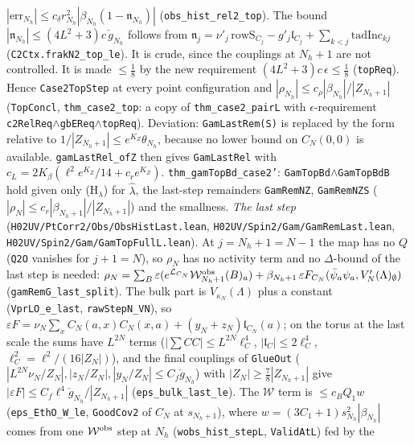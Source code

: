 \documentclass[11pt]{amsart}
\theoremstyle{definition}
\theoremstyle{remark}
\numberwithin{equation}{section}
\begin{document}
$|\mathrm{err}_{N_h}|\le c_\delta r_{N_h}^2|\beta_{N_h}(1-\mathfrak n_{N_h})|$ (\texttt{obs\_hist\_rel2\_top}). The bound
$|\mathfrak n_{N_h}|\le(4L^2+3)c\,\check g_{N_h}$ follows from $\mathfrak n_j=\nu'_j\,\mathrm{rowS}_{C_j}-g'_j\mathfrak l_{C_j}+\sum_{k<j}\mathrm{tadInc}_{kj}$
(\texttt{C2Ctx.frakN2\_top\_le}). It is crude, since the couplings at $N_h+1$ are not controlled. It is made $\le\frac18$ by the new requirement
$(4L^2+3)c\,\epsilon\le\frac18$ (\texttt{topReq}). Hence \texttt{Case2TopStep} at every point configuration and $|\rho_{N_h}|\le c_\rho|\beta_{N_h}|/|Z_{N_h+1}|$
(\texttt{TopConcl}, \texttt{thm\_case2\_top}: a copy of \texttt{thm\_case2\_pairL} with $\epsilon$-requirement
\texttt{c2RelReq}$\wedge$\texttt{gbEReq}$\wedge$\texttt{topReq}).
Deviation: \texttt{GamLastRem(S)} is replaced by the form relative to $1/|Z_{N_h+1}|\le e^{K_Z}\theta_{N_h}$, because no lower bound on $C_N(0,0)$ is available.
\texttt{gamLastRel\_ofZ} then gives \texttt{GamLastRel} with $c_L=2K_\beta(\ell^2e^{K_Z}/14+c_re^{K_Z})$.
\texttt{thm\_gamTopBd\_case2'}: \texttt{GamTopBd}$\wedge$\texttt{GamTopBdB} hold given only (H$_\lambda$) for $\hat\lambda$, the last-step remainders
\texttt{GamRemNZ}, \texttt{GamRemNZS} ($|\rho_N|\le c_r|\beta_{N_h+1}|/|Z_{N_h+1}|$) and the smallness.
\emph{The last step} (\texttt{H02UV/PtCorr2/Obs/ObsHistLast.lean}, \texttt{H02UV/Spin2/Gam/GamRemLast.lean}, \texttt{H02UV/Spin2/Gam/GamTopFullL.lean}). At $j=N_h+1=N-1$ the map has no $Q$ (\texttt{Q2O} vanishes for $j+1=N$), so $\rho_N$ has no activity term and
no $\Delta$-bound of the last step is needed: $\rho_N=\sum_B\varepsilon(e^{\mathcal L_{C_N}}\mathcal W^{\rm obs}_{N_h+1}(B)_a)+\beta_{N_h+1}\,\varepsilon F_{C_N}(\bar\psi_a\psi_a,V'_N(\Lambda)_\emptyset)$
(\texttt{gamRemG\_last\_split}). The bulk part is $V_{\kappa_N}(\Lambda)$ plus a constant (\texttt{VprLO\_e\_last}, \texttt{rawStepN\_VN}), so
$\varepsilon F=\nu_N\sum_xC_N(a,x)C_N(x,a)+(y_N+z_N)\mathfrak l_{C_N}(a)$; on the torus at the last scale the sums have $L^{2N}$ terms
($|\sum CC|\le L^{2N}\ell_C^4$, $|\mathfrak l_C|\le2\ell_C^4$, $\ell_C^2=\ell^2/(16|Z_N|)$), and the final couplings of \texttt{GlueOut}
($|L^{2N}\nu_N/Z_N|,|z_N/Z_N|,|y_N/Z_N|\le C_f\check g_{N_h}$) with $|Z_N|\ge\frac78|Z_{N_h+1}|$ give $|\varepsilon F|\le C_f\ell^4\check g_{N_h}/|Z_{N_h+1}|$
(\texttt{eps\_bulk\_last\_le}). The $\mathcal W$ term is $\le c_BQ_1w$ (\texttt{eps\_EthO\_W\_le}, \texttt{GoodCov2} of $C_N$ at $s_{N_h+1}$), where
$w=(3C_1+1)s_{N_h}^2|\beta_{N_h}|$ comes from one $\mathcal W^{\rm obs}$ step at $N_h$ (\texttt{wobs\_hist\_stepL}, \texttt{ValidAtL}) fed by the
\end{document}
